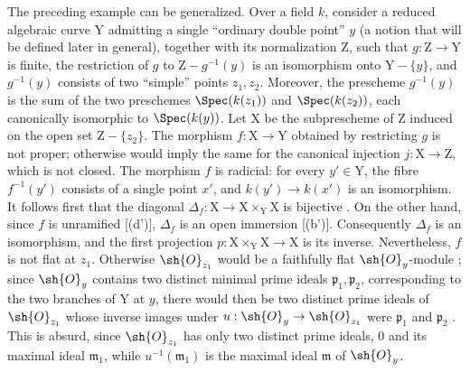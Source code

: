\begin{env}[11.7.3]
\label{IV.11.7.3}
The preceding example can be generalized. Over a field $k$, consider a reduced algebraic curve $\mathrm{Y}$ admitting a single ``ordinary double point'' $y$ (a notion that will be defined later in general), together with its normalization $\mathrm{Z}$, such that $g:\mathrm{Z}\to\mathrm{Y}$ is finite, the restriction of $g$ to $\mathrm{Z}-g^{-1}(y)$ is an isomorphism onto $\mathrm{Y}-\{y\}$, and $g^{-1}(y)$ consists of two ``simple'' points $z_1,z_2$. Moreover, the prescheme $g^{-1}(y)$ is the sum of the two preschemes $\Spec(k(z_1))$ and $\Spec(k(z_2))$, each canonically isomorphic to $\Spec(k(y))$.
Let $\mathrm{X}$ be the subprescheme of $\mathrm{Z}$ induced on the open set $\mathrm{Z}-\{z_2\}$. The morphism $f:\mathrm{X}\to\mathrm{Y}$ obtained by restricting $g$ is not proper; otherwise  would imply the same for the canonical injection $j:\mathrm{X}\to\mathrm{Z}$, which is not closed.
The morphism $f$ is radicial: for every $y'\in\mathrm{Y}$, the fibre $f^{-1}(y')$ consists of a single point $x'$, and $k(y')\to k(x')$ is an isomorphism. It follows first that the diagonal $\Delta_f:\mathrm{X}\to\mathrm{X}\times_\mathrm{Y}\mathrm{X}$ is bijective . On the other hand, since $f$ is unramified [(d')], $\Delta_f$ is an open immersion [(b')]. Consequently $\Delta_f$ is an isomorphism, and the first projection $p:\mathrm{X}\times_\mathrm{Y}\mathrm{X}\to\mathrm{X}$ is its inverse.
Nevertheless, $f$ is not flat at $z_1$. Otherwise $\sh{O}_{z_1}$ would be a faithfully flat $\sh{O}_y$-module ; since $\sh{O}_y$ contains two distinct minimal prime ideals $\mathfrak{p}_1,\mathfrak{p}_2$, corresponding to the two branches of $\mathrm{Y}$ at $y$, there would then be two distinct prime ideals of $\sh{O}_{z_1}$ whose inverse images under $u:\sh{O}_y\to\sh{O}_{z_1}$ were $\mathfrak{p}_1$ and $\mathfrak{p}_2$ . This is absurd, since $\sh{O}_{z_1}$ has only two distinct prime ideals, $0$ and its maximal ideal $\mathfrak{m}_1$, while $u^{-1}(\mathfrak{m}_1)$ is the maximal ideal $\mathfrak{m}$ of $\sh{O}_y$.
\end{env}

